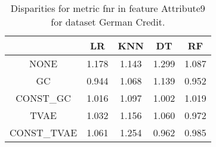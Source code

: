 \begin{table}
\caption{Disparities for metric fnr in feature Attribute9 for dataset German Credit.}
\label{tab:disp-GERMAN CREDIT-Attribute9-fnr}
\begin{tabular}{ccccc}
\toprule
 & LR & KNN & DT & RF \\
\midrule
NONE & 1.178 & 1.143 & 1.299 & 1.087 \\
GC & 0.944 & 1.068 & 1.139 & 0.952 \\
CONST\_GC & 1.016 & 1.097 & 1.002 & 1.019 \\
TVAE & 1.032 & 1.156 & 1.060 & 0.972 \\
CONST\_TVAE & 1.061 & 1.254 & 0.962 & 0.985 \\
\bottomrule
\end{tabular}
\end{table}
